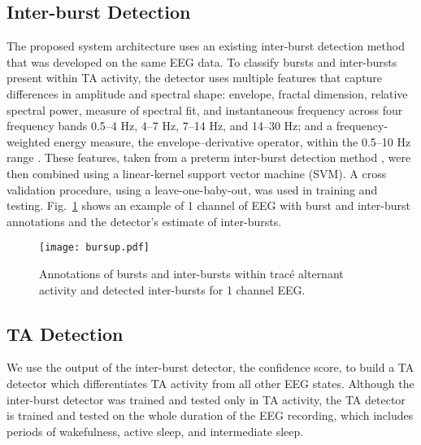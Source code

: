 \documentclass[conference]{IEEEtran}
\begin{document}
\subsection{Inter-burst Detection}
The proposed system architecture uses an existing inter-burst detection method \cite{raurale2020ta} that was developed on the same EEG data.
To classify bursts and inter-bursts present within TA activity, the detector uses multiple features that capture differences in amplitude and spectral shape: envelope, fractal dimension, relative spectral power, measure of spectral fit, and instantaneous frequency across four frequency bands 0.5–4 Hz, 4–7 Hz, 7–14 Hz, and 14–30 Hz; and a frequency-weighted energy measure, the envelope--derivative operator, within the 0.5--10 Hz range \cite{otoole1}.
These features, taken from a preterm inter-burst detection method \cite{otoole1}, were then combined using a linear-kernel support vector machine (SVM). A cross validation procedure, using a leave-one-baby-out, was used in training and testing. Fig.~\ref{fig_bursup} shows an example of 1 channel of EEG with burst and inter-burst annotations and the detector's estimate of inter-bursts. 

\begin{figure}[!h]
	\centering
	\texttt{[image: bursup.pdf]}
	\caption{Annotations of bursts and inter-bursts within trac\'e alternant activity and detected inter-bursts for 1 channel EEG.}
	\label{fig_bursup}
\end{figure}


\subsection{TA Detection}
We use the output of the inter-burst detector, the confidence score, to build a TA detector which differentiates TA activity from all other EEG states. Although the inter-burst detector was trained and tested only in TA activity, the TA detector is trained and tested on the whole duration of the EEG recording, which includes periods of wakefulness, active sleep, and intermediate sleep.
\end{document}

